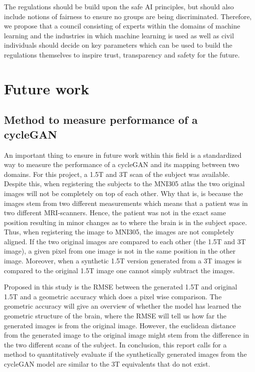 \documentclass[12pt, fleqn, titlepage]{article}
\newcommand{\1}[1]{\mathds{1}\left[#1\right]}
\begin{document}
The regulations should be build upon the safe AI principles, but should also include notions of fairness to ensure no groups are being discriminated. Therefore, we propose that a council consisting of experts within the domains of machine learning and the industries in which machine learning is used as well as civil individuals should decide on key parameters which can be used to build the regulations themselves to inspire trust, transparency and safety for the future. 

\section{Future work} \label{future_work}


\subsection{Method to measure performance of a cycleGAN}\label{fture_work_measure}
An important thing to ensure in future work within this field is a standardized way to measure the performance of a cycleGAN and its mapping between two domains. For this project, a 1.5T and 3T scan of the subject was available. Despite this, when registering the subjects to the MNI305 atlas the two original images will not be completely on top of each other. Why that is, is because the images stem from two different measurements which means that a patient was in two different MRI-scanners. Hence, the patient was not in the exact same position resulting in minor changes as to where the brain is in the subject space. Thus, when registering the image to MNI305, the images are not completely aligned. If the two original images are compared to each other (the 1.5T and 3T image), a given pixel from one image is not in the same position in the other image. Moreover, when a synthetic 1.5T version generated from a 3T images is compared to the original 1.5T image one cannot simply subtract the images.

Proposed in this study is the RMSE between the generated 1.5T and original 1.5T and a geometric accuracy which does a pixel wise comparison. The geometric accuracy will give an overview of whether the model has learned the geometric structure of the brain, where the RMSE will tell us how far the generated images is from the original  image. However, the euclidean distance from the generated image to the original image might stem from the difference in the two different scans of the subject. In conclusion, this report calls for a method to quantitatively evaluate if the synthetically generated images from the cycleGAN model are similar to the 3T equivalents that do not exist. 
\end{document}
